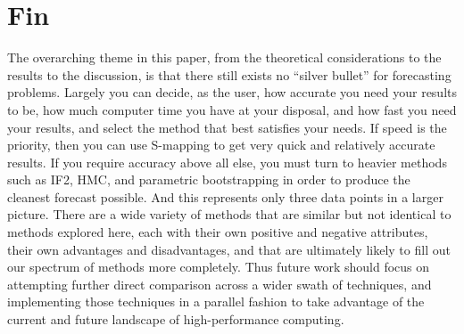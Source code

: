 \section{Fin}

	The overarching theme in this paper, from the theoretical considerations to the results to the discussion, is that there still exists no ``silver bullet'' for forecasting problems. Largely you can decide, as the user, how accurate you need your results to be, how much computer time you have at your disposal, and how fast you need your results, and select the method that best satisfies your needs. If speed is the priority, then you can use S-mapping to get very quick and relatively accurate results. If you require accuracy above all else, you must turn to heavier methods such as IF2, HMC, and parametric bootstrapping in order to produce the cleanest forecast possible. And this represents only three data points in a larger picture. There are a wide variety of methods that are similar but not identical to methods explored here, each with their own positive and negative attributes, their own advantages and disadvantages, and that are ultimately likely to fill out our spectrum of methods more completely. Thus future work should focus on attempting further direct comparison across a wider swath of techniques, and implementing those techniques in a parallel fashion to take advantage of the current and future landscape of high-performance computing.